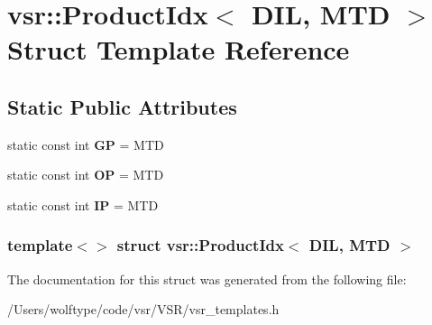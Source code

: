 \hypertarget{structvsr_1_1_product_idx_3_01_d_i_l_00_01_m_t_d_01_4}{\section{vsr\-:\-:Product\-Idx$<$ D\-I\-L, M\-T\-D $>$ Struct Template Reference}
\label{structvsr_1_1_product_idx_3_01_d_i_l_00_01_m_t_d_01_4}
}
\subsection*{Static Public Attributes}
\begin{DoxyCompactItemize}
\item 
\hypertarget{structvsr_1_1_product_idx_3_01_d_i_l_00_01_m_t_d_01_4_a168f364bd301514767410d3644f1230c}{static const int {\bfseries G\-P} = M\-T\-D}\label{structvsr_1_1_product_idx_3_01_d_i_l_00_01_m_t_d_01_4_a168f364bd301514767410d3644f1230c}

\item 
\hypertarget{structvsr_1_1_product_idx_3_01_d_i_l_00_01_m_t_d_01_4_a942352d4263ab60a94c6f055baadde7c}{static const int {\bfseries O\-P} = M\-T\-D}\label{structvsr_1_1_product_idx_3_01_d_i_l_00_01_m_t_d_01_4_a942352d4263ab60a94c6f055baadde7c}

\item 
\hypertarget{structvsr_1_1_product_idx_3_01_d_i_l_00_01_m_t_d_01_4_a11737b5afa08bd3212621bee318503f8}{static const int {\bfseries I\-P} = M\-T\-D}\label{structvsr_1_1_product_idx_3_01_d_i_l_00_01_m_t_d_01_4_a11737b5afa08bd3212621bee318503f8}

\end{DoxyCompactItemize}
\subsubsection*{template$<$$>$ struct vsr\-::\-Product\-Idx$<$ D\-I\-L, M\-T\-D $>$}



The documentation for this struct was generated from the following file\-:\begin{DoxyCompactItemize}
\item 
/\-Users/wolftype/code/vsr/\-V\-S\-R/vsr\-\_\-templates.\-h\end{DoxyCompactItemize}
